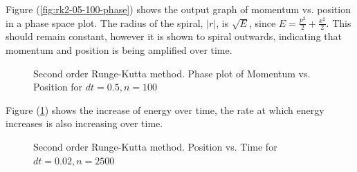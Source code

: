 \documentclass[pdf,color]{UoBnote}
\begin{document}
Figure (\ref{fig:rk2-05-100-phase}) shows the output graph of momentum vs. position in a phase space plot. The radius of the spiral, $\vert r \vert$, is $\sqrt{E}$, since $E = \frac{p^2}{2} + \frac{x^2}{2}$. This should remain constant, however it is shown to spiral outwards, indicating that momentum and position is being amplified over time.

\begin{figure}[H]
					\centering
					\caption{Second order Runge-Kutta method. Phase plot of Momentum vs. Position for $dt = 0.5, n = 100$}
					\label{fig:rk2-05-100-energy}
				\end{figure}
						

Figure (\ref{fig:rk2-05-100-energy}) shows the increase of energy over time, the rate at which energy increases is also increasing over time.

				\begin{figure}[H]
					\centering
					\caption{Second order Runge-Kutta method. Position vs. Time for $dt = 0.02, n = 2500$}
					\label{fig:rk2-002-2500-xt}
				\end{figure}
				
\end{document}
